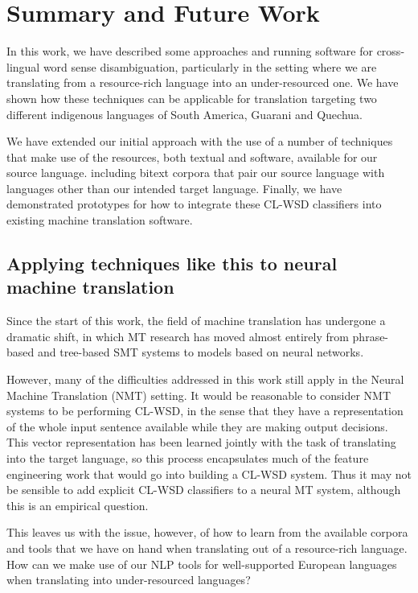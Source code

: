 \chapter{Summary and Future Work}
\label{chap:conclusions}

In this work, we have described some approaches and running software for
cross-lingual word sense disambiguation, particularly in the setting where we
are translating from a resource-rich language into an under-resourced one.
We have shown how these techniques can be applicable for translation targeting
two different indigenous languages of South America, Guarani and Quechua.

We have extended our initial approach with the use of a number of techniques
that make use of the resources, both textual and software, available for our
source language.
including bitext corpora that pair our source language with languages other
than our intended target language.
Finally, we have demonstrated prototypes for how to integrate these CL-WSD
classifiers into existing machine translation software.


\section{Applying techniques like this to neural machine translation}
Since the start of this work, the field of machine translation has undergone a
dramatic shift, in which MT research has moved almost entirely from
phrase-based and tree-based SMT systems to models based on neural networks.

However, many of the difficulties addressed in this work still apply in the
Neural Machine Translation (NMT) setting. It would be reasonable to consider
NMT systems to be performing CL-WSD, in the sense that they have a
representation of the whole input sentence available while they are making
output decisions. This vector representation has been learned jointly with the
task of translating into the target language, so this process encapsulates much
of the feature engineering work that would go into building a CL-WSD system.
Thus it may not be sensible to add explicit CL-WSD classifiers to a neural MT
system, although this is an empirical question.

This leaves us with the issue, however, of how to learn from the available
corpora and tools that we have on hand when translating out of a resource-rich
language. How can we make use of our NLP tools for well-supported European
languages when translating into under-resourced languages?


